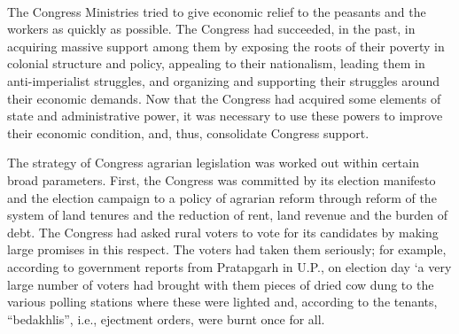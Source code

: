 \begin{multicols}{2}
\paragraph*{}
The Congress Ministries tried to give economic relief to the peasants and the workers as quickly as possible. The Congress had succeeded, in the past, in acquiring massive support among them by exposing the roots of their poverty in colonial structure and policy, appealing to their nationalism, leading them in anti-imperialist struggles, and organizing and supporting their struggles around their economic demands. Now that the Congress had acquired some elements of state and administrative power, it was necessary to use these powers to improve their economic condition, and, thus, consolidate Congress support.

The strategy of Congress agrarian legislation was worked out within certain broad parameters. First, the Congress was committed by its election manifesto and the election campaign to a policy of agrarian reform through reform of the system of land tenures and the reduction of rent, land revenue and the burden of debt. The Congress had asked rural voters to vote for its candidates by making large promises in this respect. The voters had taken them seriously; for example, according to government reports from Pratapgarh in U.P., on election day `a very large number of voters had brought with them pieces of dried cow dung to the various polling stations where these were lighted and, according to the tenants, ``bedakhlis'', i.e., ejectment orders, were burnt once for all.


\end{multicols}
